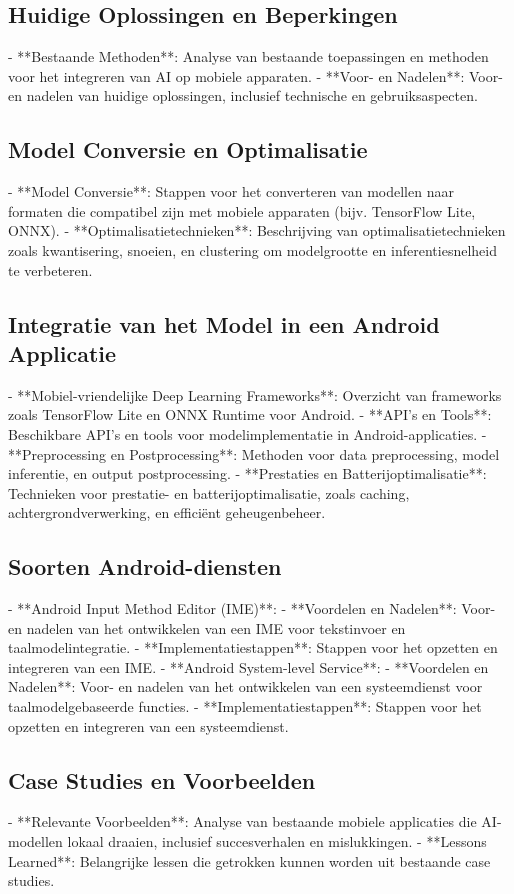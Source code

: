 \subsection{Huidige Oplossingen en Beperkingen}

- **Bestaande Methoden**: Analyse van bestaande toepassingen en methoden voor het integreren van AI op mobiele apparaten.
- **Voor- en Nadelen**: Voor- en nadelen van huidige oplossingen, inclusief technische en gebruiksaspecten.

\subsection{Model Conversie en Optimalisatie}

- **Model Conversie**: Stappen voor het converteren van modellen naar formaten die compatibel zijn met mobiele apparaten (bijv. TensorFlow Lite, ONNX).
- **Optimalisatietechnieken**: Beschrijving van optimalisatietechnieken zoals kwantisering, snoeien, en clustering om modelgrootte en inferentiesnelheid te verbeteren.

\subsection{Integratie van het Model in een Android Applicatie}

- **Mobiel-vriendelijke Deep Learning Frameworks**: Overzicht van frameworks zoals TensorFlow Lite en ONNX Runtime voor Android.
- **API's en Tools**: Beschikbare API's en tools voor modelimplementatie in Android-applicaties.
- **Preprocessing en Postprocessing**: Methoden voor data preprocessing, model inferentie, en output postprocessing.
- **Prestaties en Batterijoptimalisatie**: Technieken voor prestatie- en batterijoptimalisatie, zoals caching, achtergrondverwerking, en efficiënt geheugenbeheer.

\subsection{Soorten Android-diensten}

- **Android Input Method Editor (IME)**:
- **Voordelen en Nadelen**: Voor- en nadelen van het ontwikkelen van een IME voor tekstinvoer en taalmodelintegratie.
- **Implementatiestappen**: Stappen voor het opzetten en integreren van een IME.
- **Android System-level Service**:
- **Voordelen en Nadelen**: Voor- en nadelen van het ontwikkelen van een systeemdienst voor taalmodelgebaseerde functies.
- **Implementatiestappen**: Stappen voor het opzetten en integreren van een systeemdienst.

\subsection{Case Studies en Voorbeelden}

- **Relevante Voorbeelden**: Analyse van bestaande mobiele applicaties die AI-modellen lokaal draaien, inclusief succesverhalen en mislukkingen.
- **Lessons Learned**: Belangrijke lessen die getrokken kunnen worden uit bestaande case studies.
